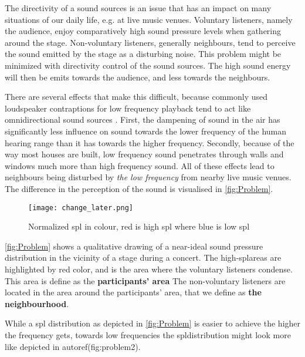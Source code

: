 
The directivity of a sound sources is an issue that has an impact on many situations of our daily life, e.g. at live music venues. Voluntary listeners, namely the audience, enjoy comparatively high sound pressure levels when gathering around the stage. Non-voluntary listeners, generally neighbours, tend to perceive the sound emitted by the stage as a disturbing noise. This problem might be minimized with directivity control of the sound sources. The high sound energy will then be emits towards the audience, and less towards the neighbours. 


There are several effects that make this difficult, because commonly used loudspeaker contraptions for low frequency playback tend to act like omnidirectional sound sources \citep[p. 1391 f.]{crocker98}.  First, the dampening of sound in the air has significantly less influence on sound towards the lower frequency of the human hearing range than it has towards the higher frequency. Secondly, because of the way most houses are built, low frequency sound penetrates through walls and windows much more than high frequency sound. All of these effects lead to neighbours being disturbed by \textit{the low frequency} from nearby live music venues.\\
The difference in the perception of the sound is visualised in \autoref{fig:Problem}.


\begin{figure}[htbp]
	\centering
	\texttt{[image: change\_later.png]}
	\caption{Normalized \gls{spl} in colour, red is high \gls{spl} where blue is low \gls{spl}}
		\label{fig:Problem}
\end{figure}

\autoref{fig:Problem} shows a qualitative drawing of a near-ideal sound pressure distribution in the vicinity of a stage during a concert. The high-\gls{spl}areas are highlighted by red color, and is the area where the voluntary listeners condense. This area is define as the \textbf{participants' area} The non-voluntary listeners are located in the area around the participants' area, that we define as \textbf{the neighbourhood}. 

While a \gls{spl} distribution as depicted in \autoref{fig:Problem} is easier to achieve the higher the frequency gets, towards low frequencies the \gls{spl}distribution might look more like depicted in autoref(fig:problem2).



